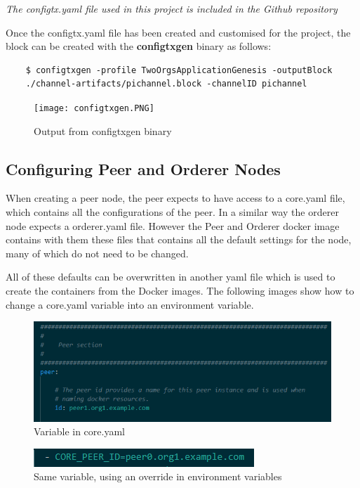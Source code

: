 \textit{The configtx.yaml file used in this project is included in the Github repository}

Once the configtx.yaml file has been created and customised for the project, the block can be created with the \textbf{configtxgen} binary as follows:
\begin{verbatim}
    $ configtxgen -profile TwoOrgsApplicationGenesis -outputBlock
    ./channel-artifacts/pichannel.block -channelID pichannel
\end{verbatim}
\begin{figure}[h]
    \centering
    \texttt{[image: configtxgen.PNG]}
    \caption{Output from configtxgen binary}
    \label{fig:my_label}
\end{figure}

\subsection{Configuring Peer and Orderer Nodes}

When creating a peer node, the peer expects to have access to a core.yaml file, which contains all the configurations of the peer. In a similar way the orderer node expects a orderer.yaml file. However the Peer and Orderer docker image contains with them these files that contains all the default settings for the node, many of which do not need to be changed.

All of these defaults can be overwritten in another yaml file which is used to create the containers from the Docker images. The following images show how to change a core.yaml variable into an environment variable.

\begin{figure}
    \centering
    \includegraphics[width=\textwidth]{peercoreyaml.PNG}
    \caption{Variable in core.yaml}
    \label{fig:my_label}
\end{figure}

\begin{figure}
    \centering
    \includegraphics[width=\textwidth]{peer envirovar.PNG}
    \caption{Same variable, using an override in environment variables}
    \label{fig:my_label}
\end{figure}

